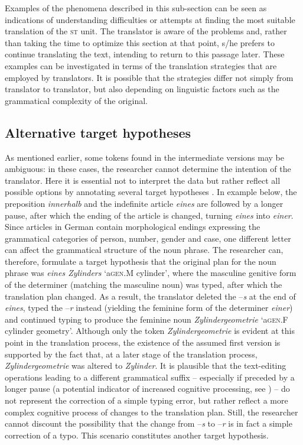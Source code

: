 \documentclass[output=paper]{LSP/langsci}
\begin{document}
Examples of the phenomena described in this sub-section can be seen as indications of understanding difficulties or attempts at finding the most suitable translation of the \textsc{st} unit. The translator is aware of the problems and, rather than taking the time to optimize this section at that point, s/he prefers to continue translating the text, intending to return to this passage later. These examples can be investigated in terms of the translation strategies that are employed by translators. It is possible that the strategies differ not simply from translator to translator, but also depending on linguistic factors such as the grammatical complexity of the original.

\subsection{Alternative target hypotheses} \label{sec:1:3:2}
As mentioned earlier, some tokens found in the intermediate versions may be ambiguous: in these cases, the researcher cannot determine the intention of the translator. Here it is essential not to interpret the data but rather reflect all possible options by annotating several target hypotheses \citep{Lüdeling2008}. In example  below, the preposition \textit{innerhalb} and the indefinite article \textit{eines} are followed by a longer pause, after which the ending of the article is changed, turning \textit{eines} into \textit{einer}. Since articles in German contain morphological endings expressing the grammatical categories of person, number, gender and case, one different letter can affect the grammatical structure of the noun phrase. The researcher can, therefore, formulate a target hypothesis that the original plan for the noun phrase was \textit{eines Zylinders} `a{\tiny \textsc{gen}.M} cylinder', where the masculine genitive form of the determiner (matching the masculine noun) was typed, after which the translation plan changed. As a result, the translator deleted the --\textit{s} at the end of \textit{eines}, typed the --\textit{r} instead (yielding the feminine form of the determiner \textit{einer}) and continued typing to produce the feminine noun \textit{Zylindergeometrie} `a{\tiny \textsc{gen}.F} cylinder geometry'. Although only the token \textit{Zylindergeometrie} is evident at this point in the translation process, the existence of the assumed first version is supported by the fact that, at a later stage of the translation process, \textit{Zylindergeometrie} was altered to \textit{Zylinder}. It is plausible that the text-editing operations leading to a different grammatical suffix -- especially if preceded by a longer pause (a potential indicator of increased cognitive processing, see \citealt{Dragsted2005}) -- do not represent the correction of a simple typing error, but rather reflect a more complex cognitive process of changes to the translation plan. Still, the researcher cannot discount the possibility that the change from --\textit{s} to --\textit{r} is in fact a simple correction of a typo. This scenario constitutes another target hypothesis.
\end{document}
